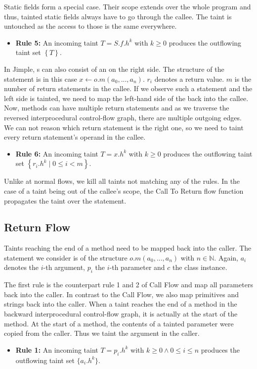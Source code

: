 \documentclass[../draft.tex]{subfiles}
\begin{document}
    Static fields form a special case.
    Their scope extends over the whole program and thus, tainted static fields always have to go through the callee.
    The taint is untouched as the access to those is the same everywhere.
    \begin{itemize}
        \item[] \textbf{Rule 5:} An incoming taint $T = S.f.h^k$ with $k \geq 0$ produces the outflowing taint set $\left\{T\right\}$.
    \end{itemize}

    In Jimple, s can also consist of an  on the right side.
    The structure of the statement is in this case $x \leftarrow o.m(a_0,...,a_n)$. $r_i$ denotes a return value.
    $m$ is the number of return statements in the callee.
    If we observe such a statement and the left side is tainted, we need to map the left-hand side of the  back into the callee.
    Now, methods can have multiple return statements and as we traverse the reversed interprocedural control-flow graph, there are multiple outgoing edges.
    We can not reason which return statement is the right one, so we need to taint every return statement's operand in the callee.
    \begin{itemize}
        \item[] \textbf{Rule 6:} An incoming taint $T = x.h^k$ with $k \geq 0$ produces the outflowing taint set $\left\{r_i.h^k \mid 0 \leq i < m \right\}$.
    \end{itemize}

    Unlike at normal flows, we kill all taints not matching any of the rules.
    In the case of a taint being out of the callee's scope, the Call To Return flow function propagates the taint over the statement.

    \subsection{Return Flow}
    Taints reaching the end of a method need to be mapped back into the caller.
    The statement we consider is of the structure $o.m(a_0, ..., a_n)$ with $n \in \mathbb{N}$.
    Again, $a_i$ denotes the $i$-th argument, $p_i$ the $i$-th parameter and $c$ the class instance.

    The first rule is the counterpart rule 1 and 2 of Call Flow\footnotemark{} and map all parameters back into the caller.
    In contrast to the Call Flow, we also map primitives and strings back into the caller.
    When a taint reaches the end of a method in the backward interprocedural control-flow graph, it is actually at the start of the method.
    At the start of a method, the contents of a tainted parameter were copied from the caller.
    Thus we taint the argument in the caller.
    \begin{itemize}
        \item[] \textbf{Rule 1:} An incoming taint $T = p_i.h^k$ with $k \geq 0 \land 0 \leq i \leq n$ produces the outflowing taint set $\{a_i.h^k\}$.
    \end{itemize}
\end{document}
